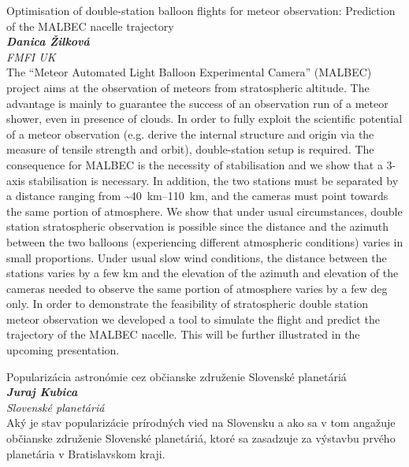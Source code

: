 \documentclass[a4paper]{report}
\begin{document}
                    \begin{tcolorbox}[
                                    colback=white,
                    colframe=black!70!white,
                                fonttitle=\Large\bfseries,
                title=17:30
            ]
                {\Large Optimisation of double-station balloon flights for meteor observation: Prediction of the MALBEC nacelle trajectory}
                                                            \\ \textbf{\textit{Danica Žilková}}
                                        \\ \textit{FMFI UK}                                \\[2ex]The “Meteor Automated Light Balloon Experimental Camera” (MALBEC) project aims at the observation of meteors from stratospheric altitude. The advantage is mainly to guarantee the success of an observation run of a meteor shower, even in presence of clouds. In order to fully exploit the scientific potential of a meteor observation (e.g. derive the internal structure and origin via the measure of tensile strength and orbit), double-station setup is required. The consequence for MALBEC is the necessity of stabilisation and we show that a 3-axis stabilisation is necessary. In addition, the two stations must be separated by a distance ranging from \textasciitilde\SIrange{40}{110}{\kilo\metre}, and the cameras must point towards the same portion of atmosphere. We show that under usual circumstances, double station stratospheric observation is possible since the distance and the azimuth between the two balloons (experiencing different atmospheric conditions) varies in small proportions. Under usual slow wind conditions, the distance between the stations varies by a few km and the elevation of the azimuth and elevation of the cameras needed to observe the same portion of atmosphere varies by a few deg only. In order to demonstrate the feasibility of stratospheric double station meteor observation we developed a tool to simulate the flight and predict the trajectory of the MALBEC nacelle. This will be further illustrated in the upcoming presentation.
            \end{tcolorbox}
                    \begin{tcolorbox}[
                                    colback=white,
                    colframe=black!70!white,
                                fonttitle=\Large\bfseries,
                title=18:00
            ]
                {\Large Popularizácia astronómie cez občianske združenie Slovenské planetáriá}
                                                            \\ \textbf{\textit{Juraj Kubica}}
                                        \\ \textit{Slovenské planetáriá}                                \\[2ex]Aký je stav popularizácie prírodných vied na Slovensku a ako sa v tom angažuje občianske združenie Slovenské planetáriá, ktoré sa zasadzuje za výstavbu prvého planetária v Bratislavskom kraji.
            \end{tcolorbox}
\end{document}
